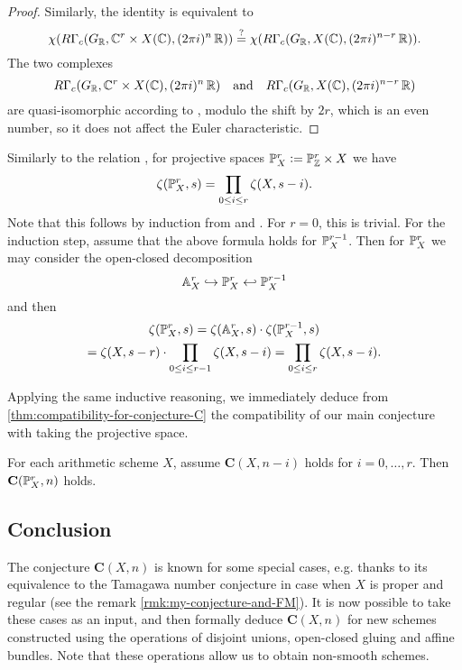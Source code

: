 \begin{theorem}
\begin{proof}
    Similarly, the identity
     is equivalent to
    \[ \chi (R\Gamma_c (G_{\mathbb{R}}, \mathbb{C}^r \times X (\mathbb{C}), (2\pi i)^n\,\mathbb{R}))
      \stackrel{?}{=}
      \chi (R\Gamma_c (G_{\mathbb{R}}, X (\mathbb{C}), (2\pi i)^{n-r}\,\mathbb{R})). \]
    The two complexes
    \[ R\Gamma_c (G_{\mathbb{R}}, \mathbb{C}^r \times X (\mathbb{C}), (2\pi i)^n\,\mathbb{R})
      \quad\text{and}\quad
      R\Gamma_c (G_{\mathbb{R}}, X (\mathbb{C}), (2\pi i)^{n-r}\,\mathbb{R}) \]
    are quasi-isomorphic according to
    , modulo the shift by $2r$,
    which is an even number, so it does not affect the Euler characteristic.
  \end{proof}
\end{theorem}

Similarly to the relation ,
for projective spaces $\mathbb{P}^r_X \mathrel{\mathop:}= \mathbb{P}^r_{\mathbb{Z}} \times X$ we have
$$\zeta (\mathbb{P}^r_X, s) = \prod_{0 \le i \le r} \zeta (X, s-i).$$
Note that this follows by induction from
 and
. For $r = 0$, this is
trivial. For the induction step, assume that the above formula holds for
$\mathbb{P}^{r-1}_X$. Then for $\mathbb{P}^r_X$ we may consider the open-closed decomposition
$$\mathbb{A}^r_X \hookrightarrow \mathbb{P}^r_X \hookleftarrow \mathbb{P}^{r-1}_X$$
and then
\begin{multline*}
  \zeta (\mathbb{P}^r_X, s) = \zeta (\mathbb{A}^r_X, s) \cdot \zeta (\mathbb{P}^{r-1}_X, s) \\
  = \zeta (X, s - r) \cdot \prod_{0 \le i \le r-1} \zeta (X, s-i) =
  \prod_{0 \le i \le r} \zeta (X, s-i).
\end{multline*}

Applying the same inductive reasoning, we immediately deduce from
\ref{thm:compatibility-for-conjecture-C} the compatibility of our main
conjecture with taking the projective space.

\begin{corollary}
  For each arithmetic scheme $X$, assume $\mathbf{C} (X, n-i)$ holds for
  $i = 0, \ldots, r$. Then $\mathbf{C} (\mathbb{P}^r_X, n)$ holds.
\end{corollary}

\subsection*{Conclusion}

The conjecture $\mathbf{C} (X, n)$ is known for some special cases, e.g. thanks
to its equivalence to the Tamagawa number conjecture in case when $X$ is proper
and regular (see the remark \ref{rmk:my-conjecture-and-FM}). It is now possible
to take these cases as an input, and then formally deduce $\mathbf{C} (X, n)$
for new schemes constructed using the operations of disjoint unions, open-closed
gluing and affine bundles. Note that these operations allow us to obtain
non-smooth schemes.
